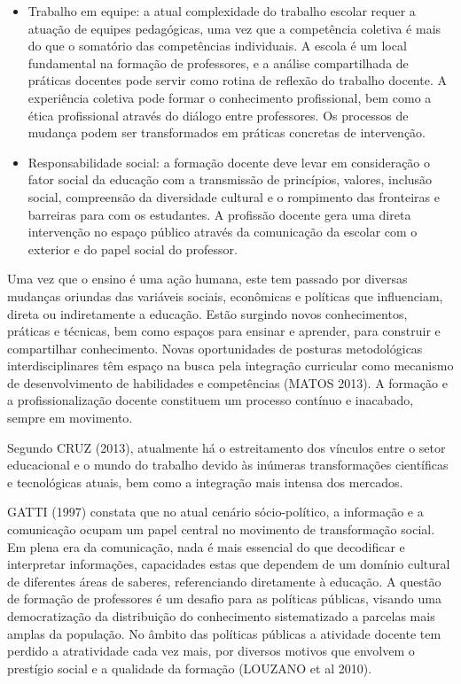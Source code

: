 \begin{itemize}
    
	\item Trabalho em equipe: a atual complexidade do trabalho escolar requer a atuação de equipes pedagógicas, uma vez que a competência coletiva é mais do que o somatório das competências individuais. A escola é um local fundamental na formação de professores, e a análise compartilhada de práticas docentes pode servir como rotina de reflexão do trabalho docente. A experiência coletiva pode formar o conhecimento profissional, bem como a ética profissional através do diálogo entre professores. Os processos de mudança podem ser transformados em práticas concretas de intervenção.
    
    
	\item Responsabilidade social: a formação docente deve levar em consideração o fator social da educação com a transmissão de princípios, valores, inclusão social, compreensão da diversidade cultural e o rompimento das fronteiras e barreiras para com os estudantes. A profissão docente gera uma direta intervenção no espaço público através da comunicação da escolar com o exterior e do papel social do professor.  
    
    \end{itemize}
    
	Uma vez que o ensino é uma ação humana, este tem passado por diversas mudanças oriundas das variáveis sociais, econômicas e políticas que influenciam, direta ou indiretamente a educação. Estão surgindo novos conhecimentos, práticas e técnicas, bem como espaços para ensinar e aprender, para construir e compartilhar conhecimento. Novas oportunidades de posturas metodológicas interdisciplinares têm espaço na busca pela integração curricular como mecanismo de desenvolvimento de habilidades e competências (MATOS 2013). A formação e a profissionalização docente constituem um processo contínuo e inacabado, sempre em movimento.
    
    
	Segundo CRUZ (2013), atualmente há o estreitamento dos vínculos entre o setor educacional e o mundo do trabalho devido às inúmeras transformações científicas e tecnológicas atuais,  bem como a integração mais intensa dos mercados.
    
    
	GATTI (1997) constata que no atual cenário sócio-político, a informação e a comunicação ocupam um papel central no movimento de transformação social. Em plena era da comunicação, nada é mais essencial do que decodificar e interpretar informações, capacidades estas que dependem de um domínio cultural de diferentes áreas de saberes, referenciando diretamente à educação. A questão de formação de professores é um desafio para as políticas públicas, visando uma democratização da distribuição do conhecimento sistematizado a parcelas mais amplas da população. No âmbito das políticas públicas a atividade docente tem perdido a atratividade cada vez mais, por diversos motivos que envolvem o prestígio social e a qualidade da formação (LOUZANO et al 2010).	
    
